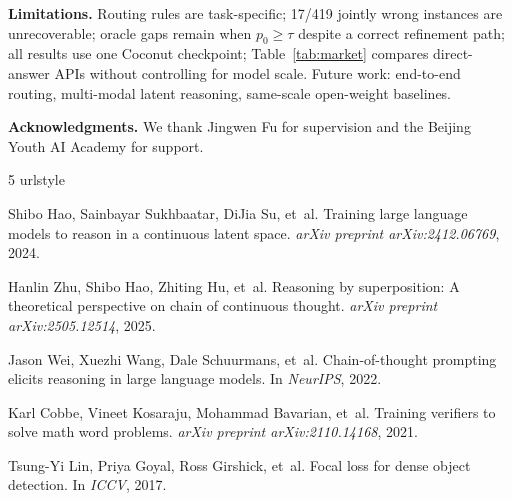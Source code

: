 \documentclass{article}
\theoremstyle{compactthm}
\theoremstyle{compactdef}
\begin{document}
\textbf{Limitations.} Routing rules are task-specific; 17/419 jointly wrong instances are unrecoverable; oracle gaps remain when $p_0\ge\tau$ despite a correct refinement path; all results use one Coconut checkpoint; Table~\ref{tab:market} compares direct-answer APIs without controlling for model scale. Future work: end-to-end routing, multi-modal latent reasoning, same-scale open-weight baselines.

\noindent\textbf{Acknowledgments.} We thank Jingwen Fu for supervision and the Beijing Youth AI Academy for support.

\begingroup
\small
\begin{thebibliography}{5}
\providecommand{\natexlab}[1]{#1}
\providecommand{\url}[1]{\texttt{#1}}
\expandafter\ifx\csname urlstyle\endcsname\relax
  \providecommand{\doi}[1]{doi: #1}\else
  \providecommand{\doi}{doi: \begingroup \urlstyle{rm}\Url}\fi

Shibo Hao, Sainbayar Sukhbaatar, DiJia Su, et~al.
\newblock Training large language models to reason in a continuous latent space.
\newblock \emph{arXiv preprint arXiv:2412.06769}, 2024.

Hanlin Zhu, Shibo Hao, Zhiting Hu, et~al.
\newblock Reasoning by superposition: A theoretical perspective on chain of continuous thought.
\newblock \emph{arXiv preprint arXiv:2505.12514}, 2025.

Jason Wei, Xuezhi Wang, Dale Schuurmans, et~al.
\newblock Chain-of-thought prompting elicits reasoning in large language models.
\newblock In \emph{NeurIPS}, 2022.

Karl Cobbe, Vineet Kosaraju, Mohammad Bavarian, et~al.
\newblock Training verifiers to solve math word problems.
\newblock \emph{arXiv preprint arXiv:2110.14168}, 2021.

Tsung-Yi Lin, Priya Goyal, Ross Girshick, et~al.
\newblock Focal loss for dense object detection.
\newblock In \emph{ICCV}, 2017.

\end{thebibliography}
\endgroup
\end{document}
